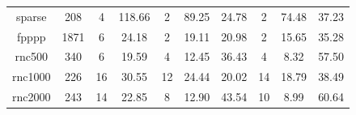 \documentclass[10pt,journal]{IEEEtran}
\begin{document}
\begin{table}[!h]
\begin{tabular}{c|c|c|c|c|c|c|c|c|c}
\hspace*{-1em}sparse\hspace*{-1em}                    &208  &4  &118.66   &2   &89.25  &\hspace*{-0.8em}24.78\hspace*{-0.8em}  &2   &74.48 &\hspace*{-0.8em}37.23\hspace*{-0.8em}  \\


\hspace*{-1em}fpppp\hspace*{-1em}             &\hspace*{-1em}1871\hspace*{-1em}  &6 &24.18  &2   &19.11  &\hspace*{-0.8em}20.98\hspace*{-0.8em} &2   &15.65 &\hspace*{-0.8em}35.28\hspace*{-0.8em} \\


\hspace*{-1em}rnc500\hspace*{-1em}        &340   &6  &19.59  &4  &12.45 &\hspace*{-0.8em}36.43\hspace*{-0.8em}  &4  &8.32 &\hspace*{-0.8em}57.50\hspace*{-0.8em} \\


\hspace*{-1em}rnc1000\hspace*{-1em}              &226    &16 &30.55  &12   &24.44  &\hspace*{-0.8em}20.02\hspace*{-0.8em}  &14  &18.79 &\hspace*{-0.8em}38.49\hspace*{-0.8em}  \\


\hspace*{-1em}rnc2000\hspace*{-1em}            &243    &14  &22.85  &8      &12.90  &\hspace*{-0.8em}43.54\hspace*{-0.8em}  &10 &8.99  &\hspace*{-0.8em}60.64\hspace*{-0.8em} \\




\end{tabular}
\end{table}
\end{document}
